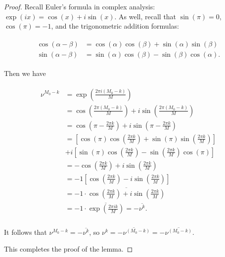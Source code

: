 \begin{proof}
Recall Euler's formula in complex analysis:
$\exp(ix) = \cos(x) + i \sin(x)$. As well, recall that
$\sin(\pi)=0$, $\cos(\pi)=-1$, and the trigonometric
addition formulas:

\begin{align}
\begin{split}
\cos(\alpha-\beta) &= \cos(\alpha) \cos(\beta) + \sin(\alpha) \sin(\beta) \\
\sin(\alpha-\beta) &= \sin(\alpha) \cos(\beta) - \sin(\beta) \cos(\alpha).
\end{split}
\end{align}

Then we have

\begin{align}
\begin{split}
\nu^{M_0-k} &= \exp\left(\frac{2 \pi i (M_0-k)}{M}\right) \\
&= \cos\left(\frac{2 \pi (M_0-k)}{M}\right) + i
\sin\left(\frac{2 \pi (M_0-k)}{M}\right) \\
&= \cos\left(\pi - \frac{2 \pi k}{M}\right) + i
\sin\left(\pi - \frac{2 \pi k}{M}\right) \\
&=
\left[
\cos(\pi) \cos\left(\frac{2 \pi k}{M}\right) +
\sin(\pi) \sin\left(\frac{2 \pi k}{M}\right)
\right] \\
&+
i \left[
\sin(\pi) \cos\left(\frac{2 \pi k}{M}\right) -
\sin\left(\frac{2 \pi k}{M}\right) \cos(\pi)
\right] \\
&=
-\cos\left(\frac{2 \pi k}{M}\right) + i
\sin\left(\frac{2 \pi k}{M}\right) \\
&=
-1 \left[ \cos\left(\frac{2 \pi k}{M}\right) - i
\sin\left(\frac{2 \pi k}{M}\right) \right] \\
&=
-1 \cdot \overline{\cos\left(\frac{2 \pi k}{M}\right) + i
\sin\left(\frac{2 \pi k}{M}\right)}  \\
&=
-1 \cdot \overline{\exp\left(\frac{2 \pi i k}{M}\right)} = - \overline{\nu^k} . \\
\end{split}
\end{align}

It follows that
$\nu^{M_0-k} = -\overline{\nu^k}$, so
$\nu^{k} = \overline{- \nu^{(M_0-k)}} = -\overline{\nu^{(M_0-k)}}$.

This completes the proof of the lemma.
\end{proof}
